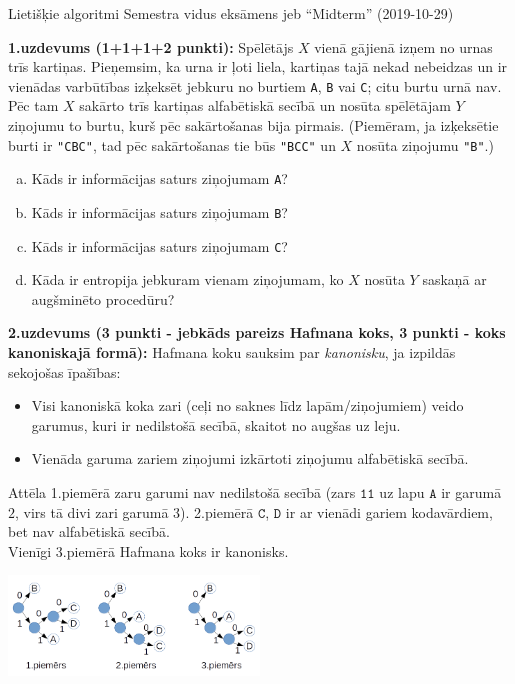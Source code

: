 \documentclass[11pt]{article}
\begin{document}
\thispagestyle{empty}

{\Large Lietišķie algoritmi \textendash{} Semestra vidus eksāmens jeb ``Midterm'' (2019-10-29)}

\noindent
{\bf 1.uzdevums (1+1+1+2 punkti):}
Spēlētājs $X$ vienā gājienā izņem no urnas trīs kartiņas. 
Pieņemsim, ka urna ir ļoti liela, kartiņas tajā nekad nebeidzas un ir vienādas varbūtības
izķeksēt jebkuru no burtiem {\tt A}, {\tt B} vai {\tt C}; citu burtu urnā nav.
Pēc tam $X$ sakārto trīs kartiņas alfabētiskā secībā un nosūta spēlētājam $Y$ ziņojumu \textendash{} to burtu, kurš 
pēc sakārtošanas bija pirmais. (Piemēram, ja izķeksētie burti ir {\tt "CBC"}, tad pēc sakārtošanas tie būs {\tt "BCC"} un 
$X$ nosūta ziņojumu {\tt "B"}.) 
\begin{enumerate}[(a)]
\item Kāds ir informācijas saturs ziņojumam {\tt A}?
\item Kāds ir informācijas saturs ziņojumam {\tt B}? 
\item Kāds ir informācijas saturs ziņojumam {\tt C}? 
\item Kāda ir entropija jebkuram vienam ziņojumam, ko $X$ nosūta $Y$ saskaņā ar augšminēto procedūru?
\end{enumerate}

\vspace{6pt}
\noindent
{\bf 2.uzdevums (3 punkti - jebkāds pareizs Hafmana koks, 3 punkti - koks kanoniskajā formā):}
Hafmana koku sauksim par {\em kanonisku}, ja izpildās sekojošas īpašības: 
\begin{itemize}
\item Visi kanoniskā koka zari (ceļi no saknes līdz lapām/ziņojumiem) veido garumus, kuri ir nedilstošā secībā, skaitot no augšas uz leju.
\item Vienāda garuma zariem ziņojumi izkārtoti ziņojumu alfabētiskā secībā. 
\end{itemize}
Attēla 1.piemērā zaru garumi nav nedilstošā secībā
(zars $\mathtt{11}$ uz lapu $\mathtt{A}$ ir garumā $2$, virs tā divi zari garumā $3$). 
2.piemērā $\mathtt{C}$, $\mathtt{D}$ ir ar vienādi gariem kodavārdiem, bet nav alfabētiskā secībā.\\
Vienīgi 3.piemērā Hafmana koks ir kanonisks.

\begin{center}
\includegraphics[width=0.5\textwidth]{huffman-examples.png}
\end{center}
\end{document}
